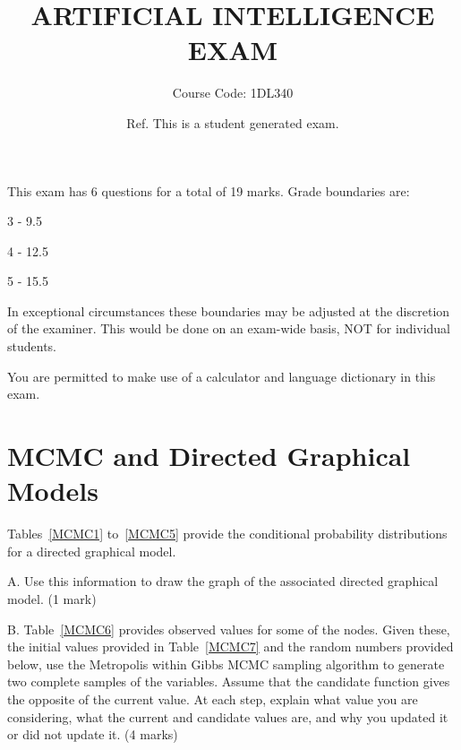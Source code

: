\documentclass{article}
\begin{document}
 \title{ARTIFICIAL INTELLIGENCE EXAM}
 \author{Course Code: 1DL340}
 \date{Ref.  This is a student generated exam. }
 \maketitle

 This exam has  6  questions for a total of  19  marks. Grade boundaries are:

 \begin{center}
 3 -  9.5 

 4 -  12.5 

 5 -  15.5 

 \end{center}

 In exceptional circumstances these boundaries may be adjusted at the discretion of the examiner. This would be done on an exam-wide basis, NOT for individual students.

 You are permitted to make use of a calculator and language dictionary in this exam.
\clearpage
\section{MCMC and Directed Graphical Models}

Tables~\ref{MCMC1} to~\ref{MCMC5} provide the conditional probability distributions for a directed graphical model.

A. Use this information to draw the graph of the associated directed graphical model. (1 mark)

B. Table~\ref{MCMC6} provides observed values for some of the nodes. Given these, the initial values provided in Table~\ref{MCMC7} and the random numbers provided below, use the Metropolis within Gibbs MCMC sampling algorithm to generate two complete samples of the variables. Assume that the candidate function gives the opposite of the current value. At each step, explain what value you are considering, what the current and candidate values are, and why you updated it or did not update it. (4 marks)
\end{document}
